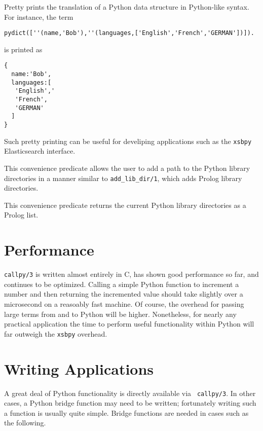 \begin{description}

Pretty prints the translation of a Python data structure in
Python-like syntax.  For instance, the term

\begin{verbatim}
pydict([''(name,'Bob'),''(languages,['English','French','GERMAN'])]).
\end{verbatim}

\noindent
is printed as 
\begin{verbatim}
{
  name:'Bob',
  languages:[
   'English','
   'French',
   'GERMAN'
  ]
}
\end{verbatim}

Such pretty printing can be useful for develiping applications such as
the {\tt xsbpy} Elasticsearch interface.

%
This convenience predicate allows the user to add a path to the Python
library directories in a manner similar to {\tt add\_lib\_dir/1},
which adds Prolog library directories.  

%
This convenience predicate returns the current Python library
directories as a Prolog list.

\end{description}

\section{Performance}

{\tt callpy/3} is written almost entirely in C, has shown good
performance so far, and continues to be optimized.  Calling a simple
Python function to increment a number and then returning the
incremented value should take slightly over a microsecond on a
reasoably fast machine.  Of course, the overhead for passing large
terms from and to Python will be higher.  Nonetheless, for nearly any
practical application the time to perform useful functionality within
Python will far outweigh the {\tt xsbpy} overhead.

\section{Writing Applications}

A great deal of Python functionality is directly available via {\tt
  callpy/3}.  In other cases, a Python bridge function may need to be
written; fortunately writing such a function is usually quite
simple.  Bridge functions are needed in cases such as the following.

